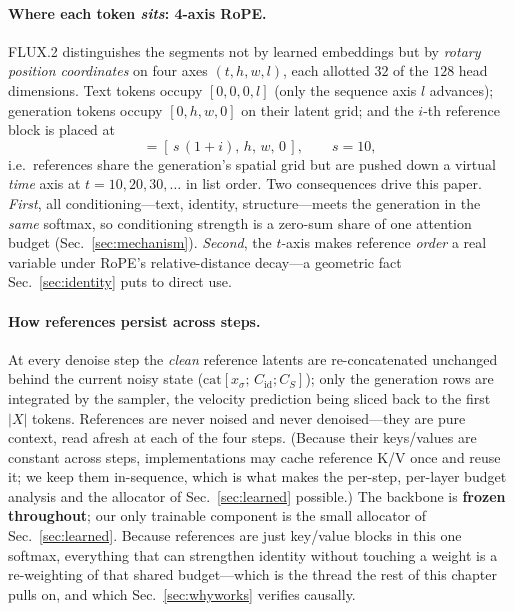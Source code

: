 \paragraph{Where each token \emph{sits}: 4-axis RoPE.} FLUX.2 distinguishes the
segments not by learned embeddings but by \emph{rotary position coordinates} on
four axes $(t,h,w,l)$, each allotted $32$ of the $128$ head dimensions. Text
tokens occupy $[0,0,0,l]$ (only the sequence axis $l$ advances); generation
tokens occupy $[0,h,w,0]$ on their latent grid; and the $i$-th reference block is
placed at
\begin{equation}
[\,t,h,w,l\,]=[\,s\,(1+i),\,h,\,w,\,0\,],\qquad s{=}10 ,
\label{eq:ropeids}
\end{equation}
i.e.\ references share the generation's spatial grid but are pushed down a
virtual \emph{time} axis at $t=10,20,30,\dots$ in list order. Two consequences
drive this paper. \emph{First}, all conditioning---text, identity,
structure---meets the generation in the \emph{same} softmax, so conditioning
strength is a zero-sum share of one attention budget (Sec.~\ref{sec:mechanism}).
\emph{Second}, the $t$-axis makes reference \emph{order} a real variable under
RoPE's relative-distance decay---a geometric fact Sec.~\ref{sec:identity} puts
to direct use.

\paragraph{How references persist across steps.} At every denoise step the
\emph{clean} reference latents are re-concatenated unchanged behind the current
noisy state ($\mathrm{cat}[x_\sigma;\,C_{\mathrm{id}};C_S]$); only the generation
rows are integrated by the sampler, the velocity prediction being sliced back to
the first $|X|$ tokens. References are never noised and never denoised---they are
pure context, read afresh at each of the four steps. (Because their keys/values
are constant across steps, implementations may cache reference K/V once and reuse
it; we keep them in-sequence, which is what makes the per-step, per-layer
budget analysis and the allocator of Sec.~\ref{sec:learned} possible.) The
backbone is \textbf{frozen throughout}; our only trainable component is the
small allocator of Sec.~\ref{sec:learned}. Because references are just
key/value blocks in this one softmax, everything that can strengthen identity
without touching a weight is a re-weighting of that shared budget---which is
the thread the rest of this chapter pulls on, and which Sec.~\ref{sec:whyworks}
verifies causally.

